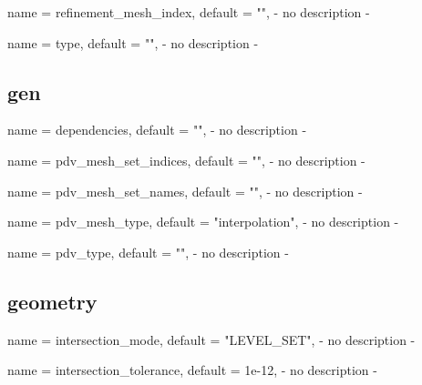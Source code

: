 \begin{parameter}{
    name    = {refinement_mesh_index},
    default = {""},
}
- no description -
\end{parameter}

\begin{parameter}{
    name    = {type},
    default = {""},
}
- no description -
\end{parameter}

\subsection{gen}

\begin{parameter}{
    name    = {dependencies},
    default = {""},
}
- no description -
\end{parameter}

\begin{parameter}{
    name    = {pdv_mesh_set_indices},
    default = {""},
}
- no description -
\end{parameter}

\begin{parameter}{
    name    = {pdv_mesh_set_names},
    default = {""},
}
- no description -
\end{parameter}

\begin{parameter}{
    name    = {pdv_mesh_type},
    default = {"interpolation"},
}
- no description -
\end{parameter}

\begin{parameter}{
    name    = {pdv_type},
    default = {""},
}
- no description -
\end{parameter}

\subsection{geometry}

\begin{parameter}{
    name    = {intersection_mode},
    default = {"LEVEL_SET"},
}
- no description -
\end{parameter}

\begin{parameter}{
    name    = {intersection_tolerance},
    default = {1e-12},
}
- no description -
\end{parameter}


